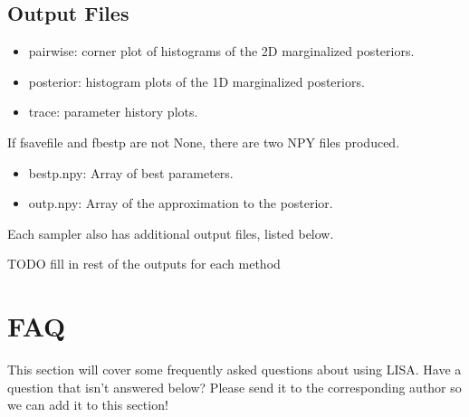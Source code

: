 \documentclass[letterpaper, 12pt]{article}
\begin{document}
\subsection{Output Files}
\begin{itemize}
\item pairwise: corner plot of histograms of the 2D marginalized posteriors.
\item posterior: histogram plots of the 1D marginalized posteriors.
\item trace: parameter history plots.
\end{itemize}

\noindent If fsavefile and fbestp are not None, there are two NPY files 
produced.
\begin{itemize}
\item bestp.npy: Array of best parameters.
\item outp.npy: Array of the approximation to the posterior.
\end{itemize}

\noindent Each sampler also has additional output files, listed below.\newline

TODO fill in rest of the outputs for each method

\section{FAQ}

This section will cover some frequently asked questions about using LISA.  
Have a question that isn't answered below?  Please send it to the corresponding 
author so we can add it to this section! \newline
\end{document}
